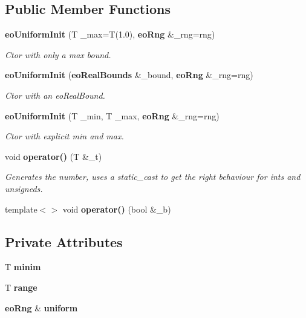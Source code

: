 \subsection*{Public Member Functions}
\begin{CompactItemize}
\item 
{\bf eo\-Uniform\-Init} (T \_\-max=T(1.0), {\bf eo\-Rng} \&\_\-rng=rng)\label{classeo_uniform_init_a0}

\begin{CompactList}\small\item\em Ctor with only a max bound. \item\end{CompactList}\item 
{\bf eo\-Uniform\-Init} ({\bf eo\-Real\-Bounds} \&\_\-bound, {\bf eo\-Rng} \&\_\-rng=rng)\label{classeo_uniform_init_a1}

\begin{CompactList}\small\item\em Ctor with an eo\-Real\-Bound. \item\end{CompactList}\item 
{\bf eo\-Uniform\-Init} (T \_\-min, T \_\-max, {\bf eo\-Rng} \&\_\-rng=rng)\label{classeo_uniform_init_a2}

\begin{CompactList}\small\item\em Ctor with explicit min and max. \item\end{CompactList}\item 
void {\bf operator()} (T \&\_\-t)\label{classeo_uniform_init_a3}

\begin{CompactList}\small\item\em Generates the number, uses a static\_\-cast to get the right behaviour for ints and unsigneds. \item\end{CompactList}\item 
template$<$$>$ void {\bf operator()} (bool \&\_\-b)\label{classeo_uniform_init_a4}

\end{CompactItemize}
\subsection*{Private Attributes}
\begin{CompactItemize}
\item 
T {\bf minim}\label{classeo_uniform_init_r0}

\item 
T {\bf range}\label{classeo_uniform_init_r1}

\item 
{\bf eo\-Rng} \& {\bf uniform}\label{classeo_uniform_init_r2}

\end{CompactItemize}


